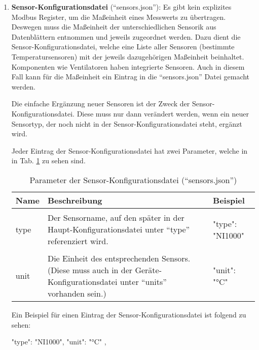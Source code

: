 \begin{enumerate}

	\item \textbf{Sensor-Konfigurationsdatei} (\enquote{sensors.json}): Es gibt kein explizites Modbus Register, um die Maßeinheit eines Messwerts zu übertragen. Deswegen muss die Maßeinheit der unterschiedlichen Sensorik aus Datenblättern entnommen und jeweils zugeordnet werden. Dazu dient die Sensor-Konfigurationsdatei, welche eine Liste aller Sensoren (\zB bestimmte Temperatursensoren) mit der jeweils dazugehörigen Maßeinheit beinhaltet. Komponenten wie Ventilatoren haben integrierte Sensoren. Auch in diesem Fall kann für die Maßeinheit ein Eintrag in die \enquote{sensors.json} Datei gemacht werden. 
	
	Die einfache Ergänzung neuer Sensoren ist der Zweck der Sensor-Konfigurationsdatei. Diese muss nur dann verändert werden, wenn ein neuer Sensortyp, der noch nicht in der Sensor-Konfigurationsdatei steht, ergänzt wird. 
	
	Jeder Eintrag der Sensor-Konfigurationsdatei hat zwei Parameter, welche in in Tab. \ref{tab:sensors_json_parameter} zu sehen sind.
		
	\begin{table}[h]
		\caption{Parameter der Sensor-Konfigurationsdatei (\enquote{sensors.json})}
		\label{tab:sensors_json_parameter}
		\begin{tabular}{p{} p{} | p{}}
			\toprule
			\textbf{Name} & \textbf{Beschreibung} & \textbf{Beispiel} \\
			\midrule
			type & Der Sensorname, auf den später in der Haupt-Konfigurationsdatei unter \enquote{type} referenziert wird. &  
			\begin{jsonTable}
"type": "NI1000"
			\end{jsonTable} 
 			\\
			unit & Die Einheit des entsprechenden Sensors. (Diese muss auch in der Geräte-Konfigurationsdatei unter \enquote{units} vorhanden sein.) &  
			\begin{jsonTable}
"unit": "°C"
			\end{jsonTable} 
			\\
			\bottomrule
		\end{tabular}
	\end{table}
	
	Ein Beispiel für einen Eintrag der Sensor-Konfigurationsdatei ist folgend zu sehen:
	\begin{jsoncode}
{
	"type": "NI1000",
	"unit": "°C"
},
	\end{jsoncode}
	

\end{enumerate}
